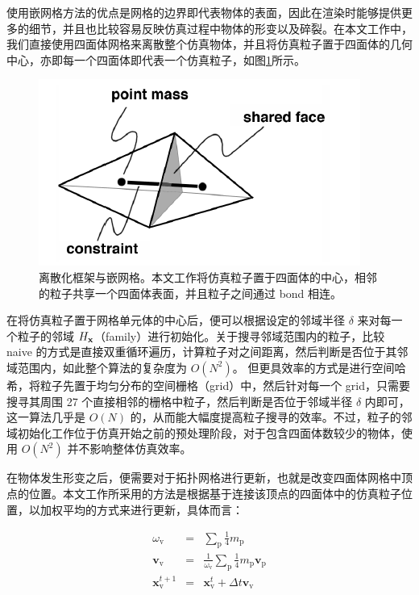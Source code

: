 使用嵌网格方法的优点是网格的边界即代表物体的表面，因此在渲染时能够提供更多的细节，并且也比较容易反映仿真过程中物体的形变以及碎裂。在本文工作中，我们直接使用四面体网格来离散整个仿真物体，并且将仿真粒子置于四面体的几何中心，亦即每一个四面体即代表一个仿真粒子，如图\ref{embedded_mesh}所示。

\begin{figure}[!htb]
  \centering
  \captionsetup{justification=centering}
  \includegraphics[width=0.6\linewidth]{chap/image/embedded_mesh}

  \caption{\label{embedded_mesh}
           离散化框架与嵌网格。本文工作将仿真粒子置于四面体的中心，相邻的粒子共享一个四面体表面，并且粒子之间通过 bond 相连。
          }
\end{figure}

在将仿真粒子置于网格单元体的中心后，便可以根据设定的邻域半径 $\delta$ 来对每一个粒子的邻域 $H_{\mathbf{x}}$（family）进行初始化。关于搜寻邻域范围内的粒子，比较 naive 的方式是直接双重循环遍历，计算粒子对之间距离，然后判断是否位于其邻域范围内，如此整个算法的复杂度为 $O(N^2)$。 但更具效率的方式是进行空间哈希，将粒子先置于均匀分布的空间栅格（grid）中，然后针对每一个 grid，只需要搜寻其周围 27 个直接相邻的栅格中粒子，然后判断是否位于邻域半径 $\delta$ 内即可，这一算法几乎是 $O(N)$ 的，从而能大幅度提高粒子搜寻的效率。不过，粒子的邻域初始化工作位于仿真开始之前的预处理阶段，对于包含四面体数较少的物体，使用 $O(N^2)$ 并不影响整体仿真效率。

在物体发生形变之后，便需要对于拓扑网格进行更新，也就是改变四面体网格中顶点的位置。本文工作所采用的方法是根据基于连接该顶点的四面体中的仿真粒子位置，以加权平均的方式来进行更新，具体而言：

\begin{eqnarray}
\omega_{\mathrm{v}} &=& \sum_{\mathrm{p}} \frac{1}{4}m_{\mathrm{p}}\\
\textbf{v}_{\mathrm{v}} &=& \frac{1}{\omega_{\mathrm{v}}}\sum_{\mathrm{p}}\frac{1}{4}m_{\mathrm{p}}\textbf{v}_{\mathrm{p}}\\
\mathbf{x}_{\mathrm{v}}^{t+1} &=& \mathbf{x}_{\mathrm{v}}^{t} + \Delta t\textbf{v}_{\mathrm{v}}
\end{eqnarray}

